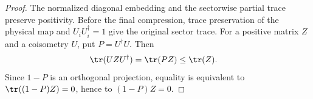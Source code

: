 \begin{proof}\leanok
    The normalized diagonal embedding and the sectorwise partial trace
    preserve positivity. Before the final compression, trace preservation of
    the physical map and $U_iU_i^\dagger=1$ give the original sector trace.
    For a positive matrix $Z$ and a coisometry $U$, put
    $P=U^\dagger U$. Then
    \begin{align}
        \tr(UZU^\dagger)
         & =\tr(PZ)
        \leq\tr(Z).
        \notag
    \end{align}
    Since $1-P$ is an orthogonal projection, equality is equivalent to
    $\tr((1-P)Z)=0$, hence to $(1-P)Z=0$.
\end{proof}
